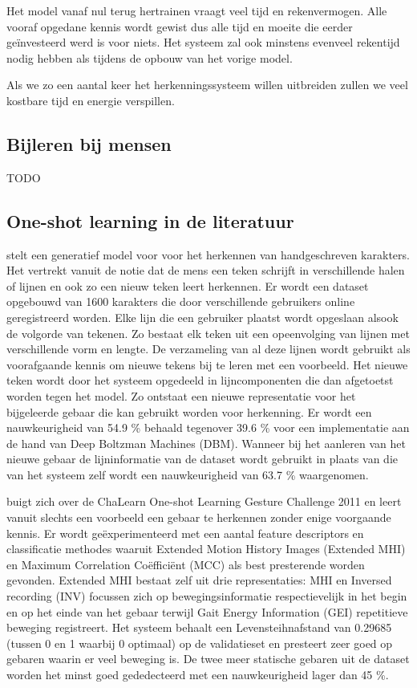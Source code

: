 \npar Het model vanaf nul terug hertrainen vraagt veel tijd en rekenvermogen. Alle vooraf opgedane kennis wordt gewist dus alle tijd en moeite die eerder ge\"investeerd werd is voor niets. Het systeem zal ook minstens evenveel rekentijd nodig hebben als tijdens de opbouw van het vorige model.

\npar Als we zo een aantal keer het herkenningssysteem willen uitbreiden zullen we veel kostbare tijd en energie verspillen.

\subsection{Bijleren bij mensen}
TODO

\subsection{One-shot learning in de literatuur}
\npar \cite{oneshot-vis-concepts} stelt een generatief model voor voor het herkennen van handgeschreven karakters. Het vertrekt vanuit de notie dat de mens een teken schrijft in verschillende halen of lijnen en ook zo een nieuw teken leert herkennen. Er wordt een dataset opgebouwd van 1600 karakters die door verschillende gebruikers online geregistreerd worden. Elke lijn die een gebruiker plaatst wordt opgeslaan alsook de volgorde van tekenen. Zo bestaat elk teken uit een opeenvolging van lijnen met verschillende vorm en lengte. De verzameling van al deze lijnen wordt gebruikt als voorafgaande kennis om nieuwe tekens bij te leren met een voorbeeld. Het nieuwe teken wordt door het systeem opgedeeld in lijncomponenten die dan afgetoetst worden tegen het model. Zo ontstaat een nieuwe representatie voor het bijgeleerde gebaar die kan gebruikt worden voor herkenning. Er wordt een nauwkeurigheid van 54.9 \% behaald tegenover 39.6 \% voor een implementatie aan de hand van Deep Boltzman Machines (DBM). Wanneer bij het aanleren van het nieuwe gebaar de lijninformatie van de dataset wordt gebruikt in plaats van die van het systeem zelf wordt een nauwkeurigheid van 63.7 \% waargenomen.

\npar \cite{oneshot-gesture-rgbd} buigt zich over de ChaLearn One-shot Learning Gesture Challenge 2011 en leert vanuit slechts een voorbeeld een gebaar te herkennen zonder enige voorgaande kennis. Er wordt ge\"experimenteerd met een aantal feature descriptors en classificatie methodes waaruit Extended Motion History Images (Extended MHI) en Maximum Correlation Co\"effici\"ent (MCC) als best presterende worden gevonden. Extended MHI  bestaat zelf uit drie representaties: MHI en Inversed recording (INV) focussen zich op bewegingsinformatie respectievelijk in het begin en op het einde van het gebaar terwijl Gait Energy Information (GEI) repetitieve beweging registreert. Het systeem behaalt een Levensteihnafstand van 0.29685 (tussen 0 en 1 waarbij 0 optimaal) op de validatieset en presteert zeer goed op gebaren waarin er veel beweging is. De twee meer statische gebaren uit de dataset worden het minst goed gededecteerd met een nauwkeurigheid lager dan 45 \%.

